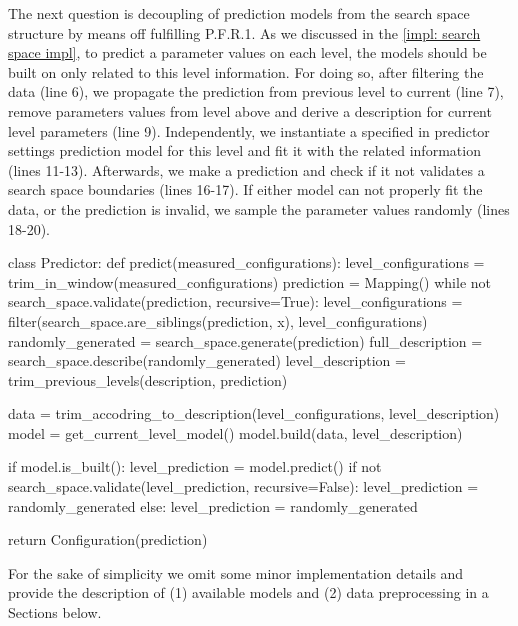 The next question is decoupling of prediction models from the search space structure by means off fulfilling P.F.R.1. As we discussed in the \cref{impl: search space impl}, to predict a parameter values on each level, the models should be built on only related to this level information. For doing so, after filtering the data (line 6), we propagate the prediction from previous level to current (line 7), remove parameters values from level above and derive a description for current level parameters (line 9). Independently, we instantiate a specified in predictor settings prediction model for this level and fit it with the related information (lines 11-13). Afterwards, we make a prediction and check if it not validates a search space boundaries (lines 16-17). If either model can not properly fit the data, or the prediction is invalid, we sample the parameter values randomly (lines 18-20).

\begin{code}[language=Python, caption=P.F.R.1 + P.F.R.3 implementation pseudo-code., label=impl: P.F.R.1 + P.F.R.3 implementation pseudocode]
class Predictor:
	def predict(measured_configurations):
		level_configurations = trim_in_window(measured_configurations)
		prediction = Mapping()
		while not search_space.validate(prediction, recursive=True):
			level_configurations = filter(search_space.are_siblings(prediction, x), level_configurations)
			randomly_generated = search_space.generate(prediction)
			full_description = search_space.describe(randomly_generated)
			level_description = trim_previous_levels(description, prediction)
			
			data = trim_accodring_to_description(level_configurations, level_description)
			model = get_current_level_model()
			model.build(data, level_description)
			
			if model.is_built():
				level_prediction = model.predict()
				if not search_space.validate(level_prediction, recursive=False):
					level_prediction = randomly_generated
			else:
				level_prediction = randomly_generated
		
		return Configuration(prediction)
\end{code}

For the sake of simplicity we omit some minor implementation details and provide the description of (1) available models and (2) data preprocessing in a Sections below.

